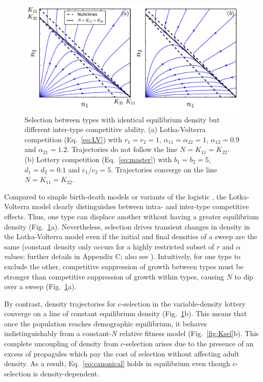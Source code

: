 \documentclass[12pt]{article}
\begin{document}
\begin{figure}
\centering
\includegraphics[scale=0.8]{LVvslottery.pdf}
\caption{\label{fig:LVvslottery} Selection between types with identical equilibrium density but different inter-type competitive ability. (a) Lotka-Volterra competition (Eq.~\ref{eq:LV}) with $r_1=r_2=1$, $\alpha_{11}=\alpha_{22}=1$, $\alpha_{12}=0.9$ and $\alpha_{21}=1.2$. Trajectories do not follow the line $N=K_{11}=K_{22}$. (b) Lottery competition (Eq.~\ref{eq:master}) with $b_1=b_2=5$, $d_1=d_2=0.1$ and $c_1/c_2=5$. Trajectories converge on the line $N=K_{11}=K_{22}$.}
\end{figure}

Compared to simple birth-death models \citep{kostitzin_1939} or variants of the logistic \citep{roughgarden_1979}, the Lotka-Volterra model clearly distinguishes between intra- and inter-type competitive effects. Thus, one type can displace another without having a greater equilibrium density (Fig.~\ref{fig:LVvslottery}a). Nevertheless, selection drives transient changes in density in the Lotka-Volterra model even if the initial and final densities of a sweep are the same (constant density only occurs for a highly restricted subset of $r$ and $\alpha$ values; further details in Appendix C; also see \citealt{mallet_2012,smouse_1976}). Intuitively, for one type to exclude the other, competitive suppression of growth between types must be stronger than competitive suppression of growth within types, causing $N$ to dip over a sweep (Fig.~\ref{fig:LVvslottery}a). 

By contrast, density trajectories for $c$-selection in the variable-density lottery converge on a line of constant equilibrium density (Fig.~\ref{fig:LVvslottery}b). This means that once the population reaches demographic equilibrium, it behaves indistinguishably from a constant-$N$ relative fitness model (Fig.~\ref{fig:Ksel}b). This complete uncoupling of density from $c$-selection arises due to the presence of an excess of propagules which pay the cost of selection without affecting adult density. As a result, Eq.~\eqref{eq:canonical} holds in equilibrium even though $c$-selection is density-dependent.
\end{document}
